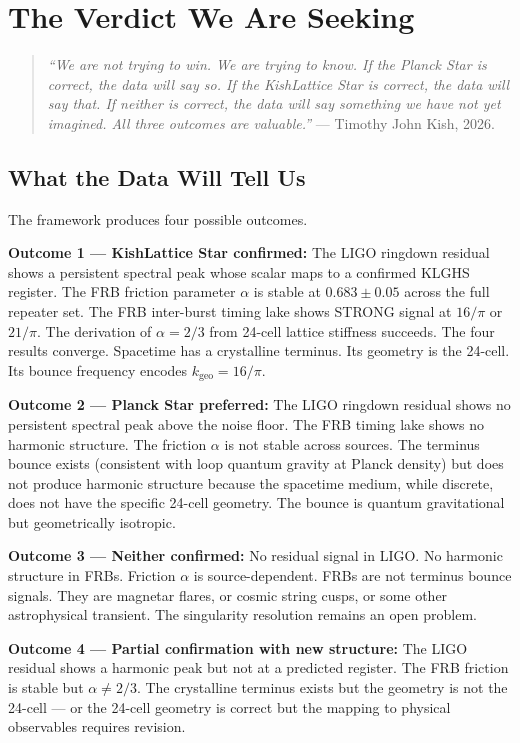 \documentclass[11pt, letterpaper, openany]{book}
\begin{document}
\chapter{The Verdict We Are Seeking}

\begin{quote}
\textit{``We are not trying to win. We are trying to know.
If the Planck Star is correct, the data will say so.
If the KishLattice Star is correct, the data will say that.
If neither is correct, the data will say something we have not
yet imagined. All three outcomes are valuable.''} --- Timothy John Kish, 2026.
\end{quote}

\section{What the Data Will Tell Us}

The framework produces four possible outcomes.

\textbf{Outcome 1 --- KishLattice Star confirmed:}
The LIGO ringdown residual shows a persistent spectral peak whose scalar
maps to a confirmed KLGHS register. The FRB friction parameter $\alpha$
is stable at $0.683 \pm 0.05$ across the full repeater set. The FRB
inter-burst timing lake shows STRONG signal at $16/\pi$ or $21/\pi$.
The derivation of $\alpha = 2/3$ from 24-cell lattice stiffness succeeds.
The four results converge. Spacetime has a crystalline terminus. Its geometry
is the 24-cell. Its bounce frequency encodes $k_\text{geo} = 16/\pi$.

\textbf{Outcome 2 --- Planck Star preferred:}
The LIGO ringdown residual shows no persistent spectral peak above the
noise floor. The FRB timing lake shows no harmonic structure. The friction
$\alpha$ is not stable across sources. The terminus bounce exists (consistent
with loop quantum gravity at Planck density) but does not produce harmonic
structure because the spacetime medium, while discrete, does not have the
specific 24-cell geometry. The bounce is quantum gravitational but
geometrically isotropic.

\textbf{Outcome 3 --- Neither confirmed:}
No residual signal in LIGO. No harmonic structure in FRBs. Friction $\alpha$
is source-dependent. FRBs are not terminus bounce signals. They are
magnetar flares, or cosmic string cusps, or some other astrophysical
transient. The singularity resolution remains an open problem.

\textbf{Outcome 4 --- Partial confirmation with new structure:}
The LIGO residual shows a harmonic peak but not at a predicted register.
The FRB friction is stable but $\alpha \neq 2/3$. The crystalline terminus
exists but the geometry is not the 24-cell --- or the 24-cell geometry is
correct but the mapping to physical observables requires revision.
\end{document}
